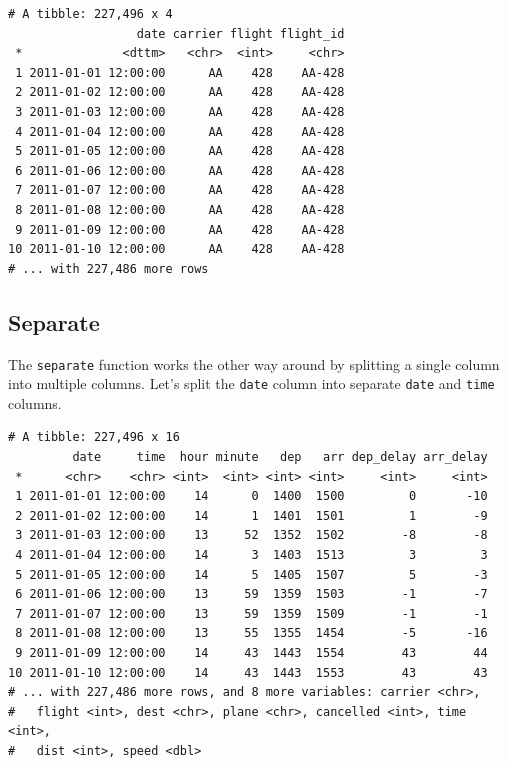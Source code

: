 \documentclass[]{article}
\newenvironment{Shaded}{\begin{snugshade}}{\end{snugshade}}
\newcommand{\KeywordTok}[1]{\textcolor[rgb]{0.13,0.29,0.53}{\textbf{{#1}}}}
\newcommand{\DataTypeTok}[1]{\textcolor[rgb]{0.13,0.29,0.53}{{#1}}}
\newcommand{\StringTok}[1]{\textcolor[rgb]{0.31,0.60,0.02}{{#1}}}
\newcommand{\NormalTok}[1]{{#1}}
\theoremstyle{definition}
\theoremstyle{definition}
\theoremstyle{definition}
\theoremstyle{remark}
\begin{document}
\begin{verbatim}
# A tibble: 227,496 x 4
                  date carrier flight flight_id
 *              <dttm>   <chr>  <int>     <chr>
 1 2011-01-01 12:00:00      AA    428    AA-428
 2 2011-01-02 12:00:00      AA    428    AA-428
 3 2011-01-03 12:00:00      AA    428    AA-428
 4 2011-01-04 12:00:00      AA    428    AA-428
 5 2011-01-05 12:00:00      AA    428    AA-428
 6 2011-01-06 12:00:00      AA    428    AA-428
 7 2011-01-07 12:00:00      AA    428    AA-428
 8 2011-01-08 12:00:00      AA    428    AA-428
 9 2011-01-09 12:00:00      AA    428    AA-428
10 2011-01-10 12:00:00      AA    428    AA-428
# ... with 227,486 more rows
\end{verbatim}

\subsection{Separate}\label{separate}

The \texttt{separate} function works the other way around by splitting a
single column into multiple columns. Let's split the \texttt{date}
column into separate \texttt{date} and \texttt{time} columns.

\begin{Shaded}
\end{Shaded}

\begin{verbatim}
# A tibble: 227,496 x 16
         date     time  hour minute   dep   arr dep_delay arr_delay
 *      <chr>    <chr> <int>  <int> <int> <int>     <int>     <int>
 1 2011-01-01 12:00:00    14      0  1400  1500         0       -10
 2 2011-01-02 12:00:00    14      1  1401  1501         1        -9
 3 2011-01-03 12:00:00    13     52  1352  1502        -8        -8
 4 2011-01-04 12:00:00    14      3  1403  1513         3         3
 5 2011-01-05 12:00:00    14      5  1405  1507         5        -3
 6 2011-01-06 12:00:00    13     59  1359  1503        -1        -7
 7 2011-01-07 12:00:00    13     59  1359  1509        -1        -1
 8 2011-01-08 12:00:00    13     55  1355  1454        -5       -16
 9 2011-01-09 12:00:00    14     43  1443  1554        43        44
10 2011-01-10 12:00:00    14     43  1443  1553        43        43
# ... with 227,486 more rows, and 8 more variables: carrier <chr>,
#   flight <int>, dest <chr>, plane <chr>, cancelled <int>, time <int>,
#   dist <int>, speed <dbl>
\end{verbatim}
\end{document}

